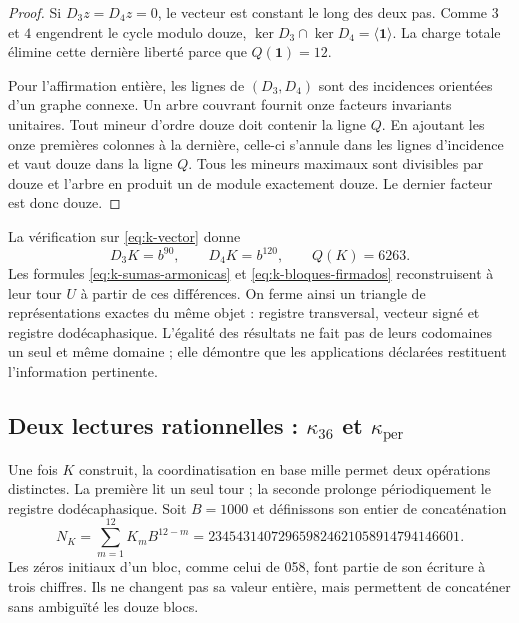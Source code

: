 \begin{proof}
Si \(D_3z=D_4z=0\), le vecteur est constant le long des deux pas.
Comme \(3\) et \(4\) engendrent le cycle modulo douze,
\(\ker D_3\cap\ker D_4=\langle\mathbf1\rangle\). La charge totale
élimine cette dernière liberté parce que \(Q(\mathbf1)=12\).

Pour l'affirmation entière, les lignes de \((D_3,D_4)\) sont des incidences orientées d'un graphe connexe. Un arbre couvrant fournit onze facteurs invariants unitaires. Tout mineur d'ordre douze doit contenir la ligne \(Q\). En ajoutant les onze premières colonnes à la dernière, celle-ci s'annule dans les lignes d'incidence et vaut douze dans la ligne \(Q\). Tous les mineurs maximaux sont divisibles par douze et l'arbre en produit un de module exactement douze. Le dernier facteur est donc douze.
\end{proof}

La vérification sur \eqref{eq:k-vector} donne
\[
 D_3K=b^{90},\qquad D_4K=b^{120},\qquad Q(K)=6263.
\]
Les formules \eqref{eq:k-sumas-armonicas} et
\eqref{eq:k-bloques-firmados} reconstruisent à leur tour \(U\) à partir de ces
différences. On ferme ainsi un triangle de représentations exactes du
même objet : registre transversal, vecteur signé et registre dodécaphasique. L'égalité
des résultats ne fait pas de leurs codomaines un seul et même domaine ; elle démontre que
les applications déclarées restituent l'information pertinente.



\subsection{Deux lectures rationnelles : \texorpdfstring{\(\kappa_{36}\)}{kappa36} et \texorpdfstring{\(\kappa_{\mathrm{per}}\)}{kappa périodique}}
\label{subsec:k-kappas}

Une fois \(K\) construit, la coordinatisation en base mille permet deux opérations
distinctes. La première lit un seul tour ; la seconde prolonge périodiquement le registre
dodécaphasique. Soit \(B=1000\) et définissons son entier de concaténation
\begin{equation}
 N_K=\sum_{m=1}^{12}K_mB^{12-m}
 =234543140729659824621058914794146601.
 \label{eq:k-numerador}
\end{equation}
Les zéros initiaux d'un bloc, comme celui de 058, font partie de son écriture
à trois chiffres. Ils ne changent pas sa valeur entière, mais permettent de concaténer
sans ambiguïté les douze blocs.


